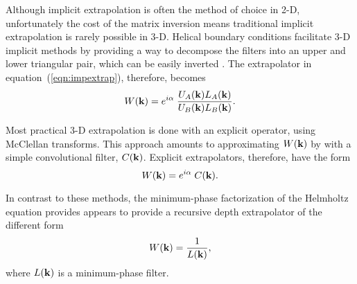 \par
Although implicit extrapolation is often the method of choice in 2-D, 
unfortunately the cost of the matrix inversion means traditional
implicit extrapolation is rarely possible in 3-D.
Helical boundary conditions facilitate 3-D implicit methods by
providing a way to decompose the filters into an upper and lower
triangular pair, which can be easily inverted
\cite{Rickett.sep.97.james1}.  
The extrapolator in equation~(\ref{eqn:impextrap}), therefore, becomes
\begin{equation}
W({\bf k})=e^{i\alpha} \; 
\frac{U_A({\bf k}) L_A({\bf k})}{U_B({\bf k})L_B({\bf k})}.
\end{equation}

\par
Most practical 3-D extrapolation is done with an explicit operator,
using McClellan transforms. This approach amounts to approximating
$W({\bf k})$ by with a simple convolutional filter, $C({\bf k})$.
Explicit extrapolators, therefore, have the form
\begin{equation}
W({\bf k})=e^{i\alpha} \; C({\bf k}).
\end{equation}

\par
In contrast to these methods, the minimum-phase factorization of the
Helmholtz equation provides appears to provide a recursive depth
extrapolator of the different form
\begin{equation} \label{eqn:helmextrap}
W({\bf k})=\frac{1}{L({\bf k})},
\end{equation}
where $L({\bf k})$ is a minimum-phase filter.  


